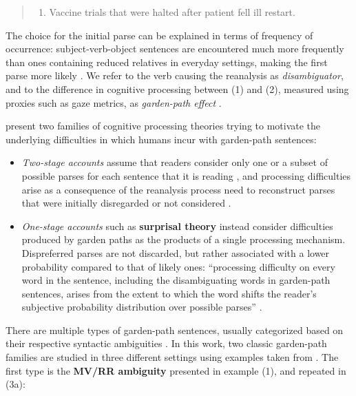 \documentclass[a4paper, nobind]{templates/ociamthesis}
\providecommand{\tightlist}{%
  \setlength{\itemsep}{0pt}\setlength{\parskip}{0pt}}
\begin{document}
\begin{quote}
\begin{enumerate}
\def\labelenumi{(\arabic{enumi})}
\setcounter{enumi}{1}
\tightlist
\item
  Vaccine trials that were halted after patient fell ill restart.
\end{enumerate}
\end{quote}

The choice for the initial parse can be explained in terms of frequency of occurrence: subject-verb-object sentences are encountered much more frequently than ones containing reduced relatives in everyday settings, making the first parse more likely \autocite{fine-2013-rapid}. We refer to the verb causing the reanalysis as \emph{disambiguator}, and to the difference in cognitive processing between (1) and (2), measured using proxies such as gaze metrics, as \emph{garden-path effect} \autocite{bever-1970-cognitive}.

\textcite{schjindel-linzen-2020-single} present two families of cognitive processing theories trying to motivate the underlying difficulties in which humans incur with garden-path sentences:

\begin{itemize}
\item
  \emph{Two-stage accounts} assume that readers consider only one or a subset of possible parses for each sentence that it is reading \autocites{gibson-1991-computational}{jurafsky-1996-probabilistic}, and processing difficulties arise as a consequence of the reanalysis process need to reconstruct parses that were initially disregarded or not considered \autocite{frazier-1978-sausage}.
\item
  \emph{One-stage accounts} such as \textbf{surprisal theory} \autocites{hale-2001-probabilistic}{levy-2008-expectation} instead consider difficulties produced by garden paths as the products of a single processing mechanism. Dispreferred parses are not discarded, but rather associated with a lower probability compared to that of likely ones: ``processing difficulty on every word in the sentence, including the disambiguating words in garden-path sentences, arises from the extent to which the word shifts the reader's subjective probability distribution over possible parses'' \autocite{schjindel-linzen-2020-single}.
\end{itemize}

There are multiple types of garden-path sentences, usually categorized based on their respective syntactic ambiguities \autocite{frazier-1978-comprehending}. In this work, two classic garden-path families are studied in three different settings using examples taken from \textcite{futrell-etal-2019-neural}. The first type is the \textbf{MV/RR ambiguity} presented in example (1), and repeated in (3a):
\end{document}

